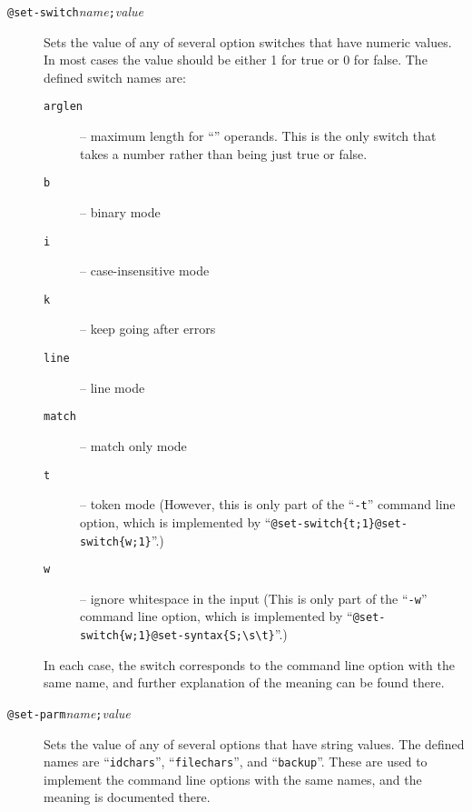 \begin{description}
\item[{\tt @set-switch\ttlb}{\it name}{\tt ;}{\it value}{\tt \ttrb}]
Sets the value of any of several option switches that have numeric values.
In most cases the value should be either 1 for true or 0 for false.
The defined switch names are:
\begin{description}
\item[\tt arglen] -- maximum length for ``{\tt *}'' operands.  This is
the only switch that takes a number rather than being just true or false.
\item[\tt b] -- binary mode
\item[\tt i] -- case-insensitive mode
\item[\tt k] -- keep going after errors
\item[\tt line] -- line mode
\item[\tt match] -- match only mode
\item[\tt t] -- token mode
(However, this is only part of the ``\verb/-t/'' command line option,
which is implemented by
``\verb/@set-switch{t;1}@set-switch{w;1}/''.)
\item[\tt w] -- ignore whitespace in the input
(This is only part of the ``\verb/-w/'' command line option, which is
implemented by
``\verb/@set-switch{w;1}@set-syntax{S;\s\t}/''.)
\end{description}
In each case, the switch corresponds to the command line option with the
same name, and further explanation of the meaning can be found there.

\item[{\tt @set-parm\ttlb}{\it name}{\tt ;}{\it value}{\tt \ttrb}]
Sets the value of any of several options that have string values.
The defined names are ``\verb/idchars/'', ``\verb/filechars/'', and
``\verb/backup/''.  These are used to implement the command line options
with the same names, and the meaning is documented there.


\end{description}
